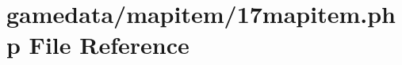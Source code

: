 \hypertarget{17mapitem_8php}{\section{gamedata/mapitem/17mapitem.php File Reference}
\label{17mapitem_8php}
}
